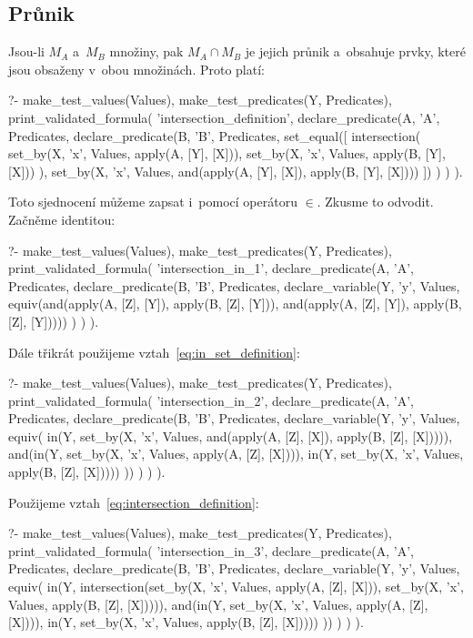\subsection{Průnik}
Jsou-li \(M_A\) a~\(M_B\) množiny, pak \(M_A \cap M_B\) je jejich průnik a~obsahuje prvky, které jsou obsaženy v~obou množinách. Proto platí:

\begin{prolog}
?- 	make_test_values(Values),
	make_test_predicates(Y, Predicates),
	print_validated_formula(
		'intersection_definition',
		declare_predicate(A, 'A', Predicates,
			declare_predicate(B, 'B', Predicates,
				set_equal([
					intersection(
						set_by(X, 'x', Values, apply(A, [Y], [X])),
						set_by(X, 'x', Values, apply(B, [Y], [X]))
					),
					set_by(X, 'x', Values, and(apply(A, [Y], [X]), apply(B, [Y], [X])))
				])
			)
		)
	).
\end{prolog}

Toto sjednocení můžeme zapsat i~pomocí operátoru \(\in\). Zkusme to odvodit. Začněme identitou:
\begin{prolog}
?- 	make_test_values(Values),
	make_test_predicates(Y, Predicates),
	print_validated_formula(
		'intersection_in_1',
		declare_predicate(A, 'A', Predicates,
			declare_predicate(B, 'B', Predicates,
				declare_variable(Y, 'y', Values, equiv(and(apply(A, [Z], [Y]), apply(B, [Z], [Y])), and(apply(A, [Z], [Y]), apply(B, [Z], [Y]))))
			)
		)
	).
\end{prolog}

Dále třikrát použijeme vztah~\eqref{eq:in_set_definition}:
\begin{prolog}
?- 	make_test_values(Values),
	make_test_predicates(Y, Predicates),
	print_validated_formula(
		'intersection_in_2',
		declare_predicate(A, 'A', Predicates,
			declare_predicate(B, 'B', Predicates,
				declare_variable(Y, 'y', Values, equiv(
					in(Y, set_by(X, 'x', Values, and(apply(A, [Z], [X]), apply(B, [Z], [X])))),
					and(in(Y, set_by(X, 'x', Values, apply(A, [Z], [X]))), in(Y, set_by(X, 'x', Values, apply(B, [Z], [X]))))
				))
			)
		)
	).
\end{prolog}

Použijeme vztah~\eqref{eq:intersection_definition}:
\begin{prolog}
?- 	make_test_values(Values),
	make_test_predicates(Y, Predicates),
	print_validated_formula(
		'intersection_in_3',
		declare_predicate(A, 'A', Predicates,
			declare_predicate(B, 'B', Predicates,
				declare_variable(Y, 'y', Values, equiv(
					in(Y, intersection(set_by(X, 'x', Values, apply(A, [Z], [X])), set_by(X, 'x', Values, apply(B, [Z], [X])))),
					and(in(Y, set_by(X, 'x', Values, apply(A, [Z], [X]))), in(Y, set_by(X, 'x', Values, apply(B, [Z], [X]))))
				))
			)
		)
	).
\end{prolog}


